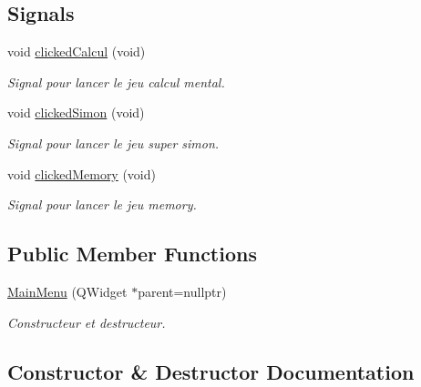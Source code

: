 \subsection*{Signals}
\begin{DoxyCompactItemize}
\item 
\mbox{\label{class_main_menu_a598cb53314acb8fc35b5f2312db6e561}} 
void \hyperlink{class_main_menu_a598cb53314acb8fc35b5f2312db6e561}{clicked\+Calcul} (void)
\begin{DoxyCompactList}\small\item\em Signal pour lancer le jeu calcul mental. \end{DoxyCompactList}\item 
\mbox{\label{class_main_menu_accfb16e9b9cbabbfd2460f8242648dd3}} 
void \hyperlink{class_main_menu_accfb16e9b9cbabbfd2460f8242648dd3}{clicked\+Simon} (void)
\begin{DoxyCompactList}\small\item\em Signal pour lancer le jeu super simon. \end{DoxyCompactList}\item 
\mbox{\label{class_main_menu_a68da1f9eb32fa5536326328c0dead36f}} 
void \hyperlink{class_main_menu_a68da1f9eb32fa5536326328c0dead36f}{clicked\+Memory} (void)
\begin{DoxyCompactList}\small\item\em Signal pour lancer le jeu memory. \end{DoxyCompactList}\end{DoxyCompactItemize}
\subsection*{Public Member Functions}
\begin{DoxyCompactItemize}
\item 
\hyperlink{class_main_menu_a891bed1e0edb5492671c332cb89b7a9a}{Main\+Menu} (Q\+Widget $\ast$parent=nullptr)
\begin{DoxyCompactList}\small\item\em Constructeur et destructeur. \end{DoxyCompactList}\end{DoxyCompactItemize}


\subsection{Constructor \& Destructor Documentation}
\mbox{\label{class_main_menu_a891bed1e0edb5492671c332cb89b7a9a}} 
